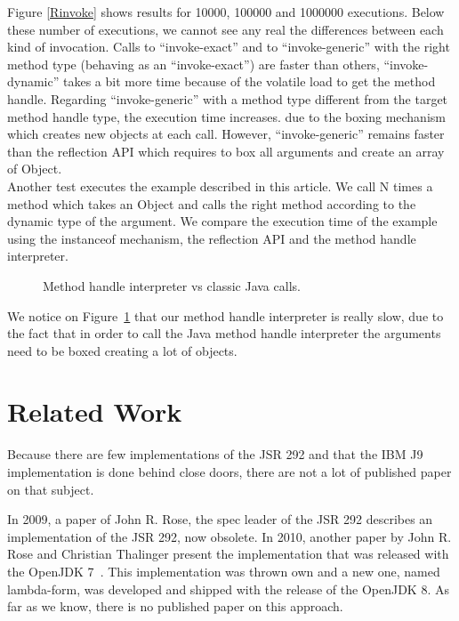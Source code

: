 \documentclass{sig-alternate}
\def \Jsr{JSR\xspace}
\def \JSR{\Jsr 292\xspace}
\begin{document}
  Figure \ref{Rinvoke} shows results for 10000, 100000 and 1000000 executions.
  Below these number of executions, we cannot see any real the differences between each kind of invocation.
  Calls to ``invoke-exact'' and to ``invoke-generic'' with the right method type (behaving as an ``invoke-exact'') are faster than others,
  ``invoke-dynamic'' takes a bit more time because of the volatile load to get the method handle.
  Regarding ``invoke-generic'' with a method type different from the target method handle type, the execution time increases.
  due to the boxing mechanism which creates new objects at each call.
  However, ``invoke-generic'' remains faster than the reflection API which requires to box all arguments and create an array of Object.\\
  
  Another test executes the example described in this article.
  We call N times a method which takes an Object and calls the right method according to the dynamic type of the argument.
  We compare the execution time of the example using the instanceof mechanism, the reflection API and the method handle interpreter.

  \begin{figure}[!h]
    \resizebox{\linewidth}{!}{}
    \caption{Method handle interpreter vs classic Java calls.}\vspace{-1em}
    \label{Rmutable}
  \end{figure}

  We notice on Figure~\ref{Rmutable} that our method handle interpreter is really slow,
  due to the fact that in order to call the Java method handle interpreter the arguments need to be boxed creating a lot of objects.

\section{Related Work}
  Because there are few implementations of the \JSR and that the IBM J9 implementation is done behind close doors,
  there are not a lot of published paper on that subject.

  In 2009, a paper of John R. Rose, the spec leader of the \JSR describes an implementation of the \JSR,
  now obsolete\cite{vmil-rose-indy-2009}. In 2010, another paper by John R. Rose and Christian Thalinger present the implementation
  that was released with the OpenJDK 7~\cite{pppj-rose-indy-2010}. This implementation was thrown own and a new one, named lambda-form,
  was developed and shipped with the release of the OpenJDK 8. As far as we know, there is no published paper on this approach.
\end{document}
